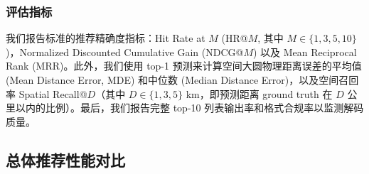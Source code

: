 \documentclass[10pt,fontset=none,twocolumn]{ctexart}
\begin{document}
\subsubsection{评估指标}
我们报告标准的推荐精确度指标：Hit Rate at $M$ (HR@$M$, 其中 $M \in \{1, 3, 5, 10\}$)，Normalized Discounted Cumulative Gain (NDCG@$M$) 以及 Mean Reciprocal Rank (MRR)。此外，我们使用 top-1 预测来计算空间大圆物理距离误差的平均值 (Mean Distance Error, MDE) 和中位数 (Median Distance Error)，以及空间召回率 Spatial Recall@$D$（其中 $D \in \{1, 3, 5\}$ km，即预测距离 ground truth 在 $D$ 公里以内的比例）。最后，我们报告完整 top-10 列表输出率和格式合规率以监测解码质量。

\subsection{总体推荐性能对比}
\end{document}
